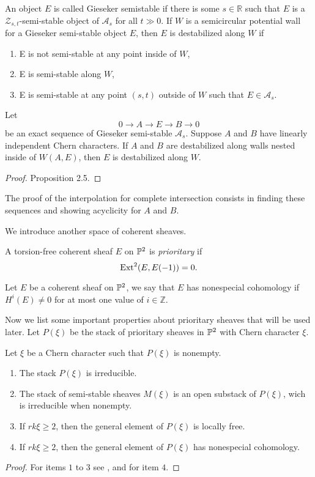 \documentclass[
	oldfontcommands,
	sumario=abnt-6027-2012,
	12pt,			%
	openright,		%
	oneside,		%
	a4paper,		%
	english,		%
	brazil			%
	]{imecc-unicamp}
\begin{document}
An object $E$ is called Gieseker semistable if there is some $s\in\mathbb R$ such that $E$ is a $\mathcal Z_{s,t}$-semi-stable object of $\mathcal A_s$ for all $t\gg0$. If $W$ is a semicircular potential wall for a Gieseker semi-stable object $E$, then $E$ is destabilized along $W$ if \begin{enumerate}
	\item E is not semi-stable at any point inside of $W$,
	\item E is semi-stable along $W$,
	\item E is semi-stable at any point $(s,t)$ outside of $W$ such that $E\in \mathcal A_s$.
\end{enumerate}


\begin{proposition}
	Let $$0\rightarrow A\rightarrow E\rightarrow B\rightarrow 0$$ be an exact sequence of Gieseker semi-stable $\mathcal A_s$. Suppose $A$ and $B$ have linearly independent Chern characters. If $A$ and $B$ are destabilized along walls nested inside of $W(A,E)$, then $E$ is destabilized along $W$.	
\end{proposition}
\begin{proof}
	\cite{COSKUN} Proposition 2.5.
\end{proof}

The proof of the interpolation for complete intersection consists in finding these sequences and showing acyclicity for $A$ and $B$.

We introduce another space of coherent sheaves.
\begin{definition}
	A torsion-free coherent sheaf $E$ on ${\mathbb P}^2$ is \textit{prioritary} if $$
	\operatorname{Ext}^2(E,E(-1))=0.
	$$  
\end{definition}
\begin{definition}
	Let $E$ be a coherent sheaf on ${\mathbb P}^2$, we say that $E$ has nonespecial cohomology if $H^i(E)\neq0$ for at most one value of $i\in \mathbb Z$.
\end{definition}
Now we list some important properties about prioritary sheaves that will be used later. Let $P(\xi)$ be the stack of prioritary sheaves in ${\mathbb P}^2$ with Chern character $\xi$.
\begin{teorema}\label{Teo 3.5} Let $\xi$ be a Chern character such that $P(\xi)$ is nonempty.
	\begin{enumerate}
		\item The stack $P(\xi)$ is irreducible.
		\item The stack of semi-stable sheaves $M(\xi)$ is an open substack of $P(\xi)$, wich is irreducible when nonempty.
		\item If $rk\xi\geq2$, then the general element of $P(\xi)$ is locally free.
		\item If $rk\xi\geq2$, then the general element of $P(\xi)$ has nonespecial cohomology.
	\end{enumerate}
\end{teorema}
\begin{proof}
	For items $1$ to $3$ see \cite{Hirschowitz1993}, and \cite{1994weak} for item $4$.
\end{proof}
\end{document}
